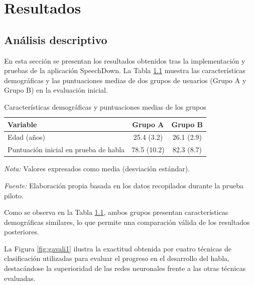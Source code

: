 \chapter{Resultados}

\section{Análisis descriptivo}

En esta sección se presentan los resultados obtenidos tras la implementación y pruebas de la aplicación SpeechDown. La Tabla \ref{tab:ejemplo} muestra las características demográficas y las puntuaciones medias de dos grupos de usuarios (Grupo A y Grupo B) en la evaluación inicial.

\begin{table}[h]
\centering
\begin{threeparttable}
\caption{Características demográficas y puntuaciones medias de los grupos}
\begin{tabular}{lcc}
\toprule
\textbf{Variable} & \textbf{Grupo A} & \textbf{Grupo B} \\
\midrule
Edad (años) & 25.4 (3.2) & 26.1 (2.9) \\
Puntuación inicial en prueba de habla & 78.5 (10.2) & 82.3 (8.7) \\
\bottomrule
\end{tabular}
\begin{tablenotes}
\item \small \textit{Nota:} Valores expresados como media (desviación estándar).
\item \small \textit{Fuente:} Elaboración propia basada en los datos recopilados durante la prueba piloto.
\end{tablenotes}
\end{threeparttable}
\label{tab:ejemplo}
\end{table}

Como se observa en la Tabla \ref{tab:ejemplo}, ambos grupos presentan características demográficas similares, lo que permite una comparación válida de los resultados posteriores. 

La Figura \ref{fig:gavali1} ilustra la exactitud obtenida por cuatro técnicas de clasificación utilizadas para evaluar el progreso en el desarrollo del habla, destacándose la superioridad de las redes neuronales frente a las otras técnicas evaluadas.

